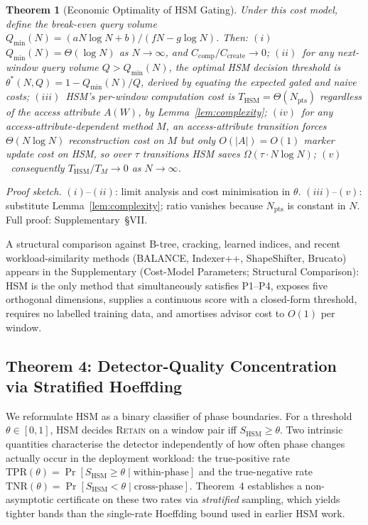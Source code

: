 \documentclass[10pt,journal,compsoc]{IEEEtran}
\newtheorem{theorem}{Theorem}
\newcommand{\SHSM}{S_{\mathrm{HSM}}}
\newcommand{\Npts}{N_{\mathrm{pts}}}
\newcommand{\thetastar}{\theta^{*}}
\newcommand{\TPR}{\mathrm{TPR}}
\newcommand{\TNR}{\mathrm{TNR}}
\begin{document}
\begin{theorem}[Economic Optimality of HSM Gating]\label{thm:econ}
Under this cost model, define the
break-even query volume
$Q_{\min}(N)\!=\!(aN\log N+b)/(fN-g\log N)$. Then:
$(i)$~$Q_{\min}(N)\!=\!\Theta(\log N)$ as $N\!\to\!\infty$, and
$C_{\mathrm{comp}}/C_{\mathrm{create}}\!\to\!0$;
$(ii)$~for any next-window query volume $Q\!>\!Q_{\min}(N)$, the
optimal HSM decision threshold is
$\thetastar(N,Q)\!=\!1-Q_{\min}(N)/Q$, derived by equating the
expected gated and naive costs;
$(iii)$~HSM's per-window computation cost is
$T_{\mathrm{HSM}}\!=\!\Theta(\Npts)$ \emph{regardless} of the access
attribute $A(W)$, by Lemma~\ref{lem:complexity};
$(iv)$~for any access-attribute-dependent method $M$, an
access-attribute transition forces $\Theta(N\log N)$ reconstruction
cost on $M$ but only $O(|A|)\!=\!O(1)$ marker update cost on HSM, so
over $\tau$ transitions HSM saves $\Omega(\tau\cdot N\log N)$;
$(v)$~consequently $T_{\mathrm{HSM}}/T_{M}\!\to\!0$ as $N\!\to\!\infty$.
\end{theorem}
\noindent\textit{Proof sketch.}
$(i)$--$(ii)$: limit analysis and cost minimisation in $\theta$.
$(iii)$--$(v)$: substitute Lemma~\ref{lem:complexity}; ratio vanishes because $\Npts$ is constant in $N$.
Full proof: Supplementary~\S VII.

A structural comparison against B-tree, cracking, learned indices, and
recent workload-similarity methods (BALANCE, Indexer++, ShapeShifter,
Brucato) appears in the Supplementary (Cost-Model Parameters;
Structural Comparison): HSM is the only method that simultaneously
satisfies P1--P4, exposes five orthogonal dimensions, supplies a
continuous score with a closed-form threshold, requires no labelled
training data, and amortises advisor cost to $O(1)$ per window.

\subsection{Theorem 4: Detector-Quality Concentration via Stratified Hoeffding}

We reformulate HSM as a binary classifier of phase boundaries. For a
threshold $\theta\!\in\![0,1]$, HSM decides \textsc{Retain} on a window
pair iff $\SHSM\!\ge\!\theta$. Two intrinsic quantities characterise the
detector independently of how often phase changes actually occur in the
deployment workload: the true-positive rate
$\TPR(\theta)\!=\!\Pr[\SHSM\!\ge\!\theta\mid\text{within-phase}]$ and the
true-negative rate $\TNR(\theta)\!=\!\Pr[\SHSM\!<\!\theta\mid\text{cross-phase}]$.
Theorem~4 establishes a non-asymptotic certificate on these two rates
via \emph{stratified} sampling, which yields tighter bands than the
single-rate Hoeffding bound used in earlier HSM work.
\end{document}
